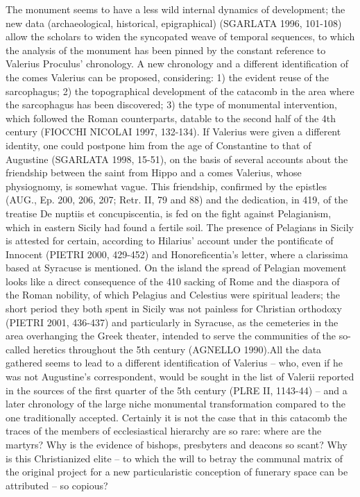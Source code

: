 \documentclass[amsthm,ebook]{saparticle}
\begin{document}
The monument seems to have a less wild internal dynamics of development; the new data (archaeological, historical, epigraphical) (SGARLATA 1996, 101-108) allow the scholars to widen the syncopated weave of temporal sequences, to which the analysis of the monument has been pinned by the constant reference to Valerius Proculus’ chronology. A new chronology and a different identification of the comes Valerius can be proposed, considering: 1) the evident reuse of the sarcophagus; 2) the topographical development of the catacomb in the area where the sarcophagus has been discovered; 3) the type of monumental intervention, which followed the Roman counterparts, datable to the second half of the 4th century (FIOCCHI NICOLAI 1997, 132-134). If Valerius were given a different identity, one could postpone him from the age of Constantine to that of Augustine (SGARLATA 1998, 15-51), on the basis of several accounts about the friendship between the saint from Hippo and a comes Valerius, whose physiognomy, is somewhat vague. This friendship, confirmed by the epistles (AUG., Ep. 200, 206, 207; Retr. II, 79 and 88) and the dedication, in 419, of the treatise De nuptiis et concupiscentia, is fed on the fight against Pelagianism, which in eastern Sicily had found a fertile soil. The presence of Pelagians in Sicily is attested for certain, according to Hilarius’ account under the pontificate of Innocent (PIETRI 2000, 429-452) and Honoreficentia’s letter, where a clarissima based at Syracuse is mentioned. On the island the spread of Pelagian movement looks like a direct consequence of the 410 sacking of Rome and the diaspora of the Roman nobility, of which Pelagius and Celestius were spiritual leaders; the short period they both spent in Sicily was not painless for Christian orthodoxy (PIETRI 2001, 436-437) and particularly in Syracuse, as the cemeteries in the area overhanging the Greek theater, intended to serve the communities of the so-called heretics throughout the 5th century (AGNELLO 1990).All the data gathered seems to lead to a different identification of Valerius – who, even if he was not Augustine’s correspondent, would be sought in the list of Valerii reported in the sources of the first quarter of the 5th century (PLRE II, 1143-44) – and a later chronology of the large niche monumental transformation compared to the one traditionally accepted.
Certainly it is not the case that in this catacomb the traces of the members of ecclesiastical hierarchy are so rare: where are the martyrs? Why is the evidence of bishops, presbyters and deacons so scant? Why is this Christianized elite – to which the will to betray the communal matrix of the original project for a new particularistic conception of funerary space can be attributed – so copious?
\end{document}
